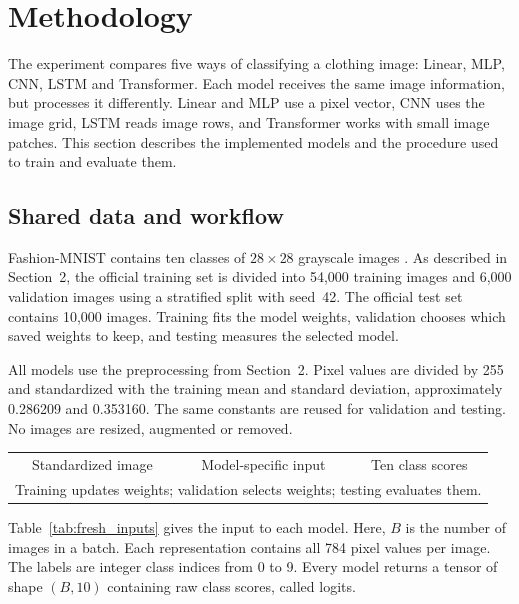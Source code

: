 \section{Methodology}
\label{sec:fresh_methodology}
The experiment compares five ways of classifying a clothing image: Linear, MLP,
CNN, LSTM and Transformer. Each model receives the same image information, but
processes it differently. Linear and MLP use a pixel vector, CNN uses the image
grid, LSTM reads image rows, and Transformer works with small image patches.
This section describes the implemented models and the procedure used to train
and evaluate them.

\subsection{Shared data and workflow}
Fashion-MNIST contains ten classes of $28\times28$ grayscale images
\cite{fresh_fashion}. As described in Section~2, the official training set is
divided into 54,000 training images and 6,000 validation images using a
stratified split with seed~42. The official test set contains 10,000 images.
Training fits the model weights, validation chooses which saved weights to
keep, and testing measures the selected model.

All models use the preprocessing from Section~2. Pixel values are divided by
255 and standardized with the training mean and standard deviation,
approximately 0.286209 and 0.353160. The same constants are reused for validation
and testing. No images are resized, augmented or removed.

\begin{center}
\small
\begin{tabular}{c@{\quad$\longrightarrow$\quad}c@{\quad$\longrightarrow$\quad}c}
Standardized image & Model-specific input & Ten class scores\\[5pt]
\multicolumn{3}{c}{Training updates weights; validation selects weights; testing evaluates them.}
\end{tabular}
\end{center}

Table~\ref{tab:fresh_inputs} gives the input to each model. Here, $B$ is the
number of images in a batch. Each representation contains all 784 pixel values
per image. The labels are integer class indices from 0 to 9. Every model returns
a tensor of shape $(B,10)$ containing raw class scores, called logits.

